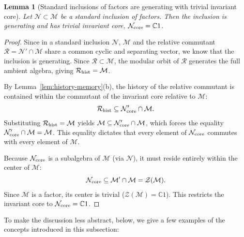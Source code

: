 \documentclass[a4paper,11pt]{article}
\newtheorem{lemma}[theorem]{Lemma}
\theoremstyle{definition}
\newcommand{\mR}{\mathcal{R}}
\newcommand{\mN}{\mathcal{N}}
\newcommand{\mM}{\mathcal{M}}
\begin{document}
\begin{lemma}[Standard inclusions of factors are generating with trivial invariant core]
\label{lem:standard-forgetful}
Let $\mN \subset \mM$ be a standard inclusion of factors. Then the inclusion is generating and has trivial invariant core, $\mN_{\rm core} = \mathbb C1$.
\end{lemma}
\begin{proof}
Since in a standard inclusion $\mN$, $\mM$ and the relative commutant $\mR = \mN' \cap \mM$ share a common cyclic and separating vector, we know that the inclusion is generating. Since $\mR \subset \mM$, the modular orbit of $\mR$ generates the full ambient algebra, giving $\mR_{\rm hist} = \mM$.

By Lemma~\ref{lem:history-memory}(b), the history of the relative commutant is contained within the commutant of the invariant core relative to $\mM$:
\begin{equation}
    \mR_{\rm hist} \subseteq \mN_{\rm core}' \cap \mM.
\end{equation}
Substituting $\mR_{\rm hist} = \mM$ yields $\mM \subseteq \mN_{\rm core}' \cap \mM$, which forces the equality $\mN_{\rm core}' \cap \mM = \mM$. This equality dictates that every element of $\mN_{\rm core}$ commutes with every element of $\mM$.

Because $\mN_{\rm core}$ is a subalgebra of $\mM$ (via $\mN$), it must reside entirely within the center of $\mM$:
\begin{equation}
    \mN_{\rm core} \subseteq \mM' \cap \mM = \mathcal Z(\mM).
\end{equation}
Since $\mM$ is a factor, its center is trivial ($\mathcal Z(\mM) = \mathbb C1$). This restricts the invariant core to $\mN_{\rm core} = \mathbb C1$.
\end{proof}

To make the discussion less abstract, below, we give a few examples of the concepts introduced in this subsection:
\end{document}
